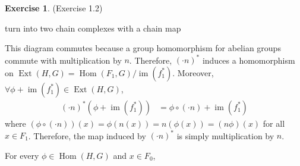 \documentclass[12pt, psamsfonts]{amsart}
\theoremstyle{definition}
\newtheorem*{exer}{Exercise}
\theoremstyle{remark}
\DeclareMathOperator{\Ext}{Ext}
\DeclareMathOperator{\Hom}{Hom}
\DeclareMathOperator{\im}{im}
\numberwithin{equation}{section}
\begin{document}
\begin{exer}{(Exercise 1.2)}
  \begin{center}
  \end{center}
  turn into two chain complexes with a chain map
  \begin{center}
  \end{center}
  This diagram commutes because a group homomorphism for abelian groups commute with multiplication by $n$.
  Therefore, $(\cdot n)^{\ast}$ induces a homomorphism on $\Ext(H, G) = \Hom(F_1, G) / \im(f_1^{\ast})$.
  Moreover, $\forall \phi + \im(f_1^{\ast}) \in \Ext(H, G)$,
  \begin{align*}
    (\cdot n)^{\ast}(\phi + \im(f_1^{\ast}))
      &= \phi \circ (\cdot n) + \im(f_1^{\ast})
  \end{align*}
  where $(\phi \circ (\cdot n))(x) = \phi(n(x)) = n(\phi(x)) = (n\phi)(x)$ for all $x \in F_1$.
  Therefore, the map induced by $(\cdot n)^{\ast}$ is simply multiplication by $n$.

  \begin{center}
  \end{center}
  For every $\phi \in \Hom(H, G)$ and $x \in F_0$,


\end{exer}
\end{document}
